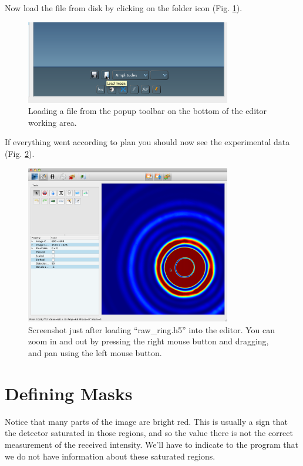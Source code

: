 \documentclass[a4paper]{article}
\begin{document}
Now load the file from disk by clicking on the folder icon (Fig. \ref{load-file}).

\begin{figure}[h!]
\centering
\includegraphics[width=0.8\textwidth]{./load-file.png}
\caption{Loading a file from the popup toolbar on the bottom of the
  editor working area.}
\label{load-file}   
\end{figure}

If everything went according to plan you should now see the
experimental data (Fig. \ref{raw-ring}).

\begin{figure}[h!]
\centering
\includegraphics[width=0.8\textwidth]{./raw-ring.png}
\caption{Screenshot just after loading ``raw\_ring.h5'' into the
 editor. You can zoom in and out by pressing the right mouse button
 and dragging, and pan using the left mouse button.}
\label{raw-ring}   
\end{figure}


\section{Defining Masks}

Notice that many parts of the image are bright red. This is usually a
sign that the detector saturated in those regions, and so the
value there is not the correct measurement of the received intensity.
We'll have to indicate to the program that we do not have information
about these saturated regions.
\end{document}
